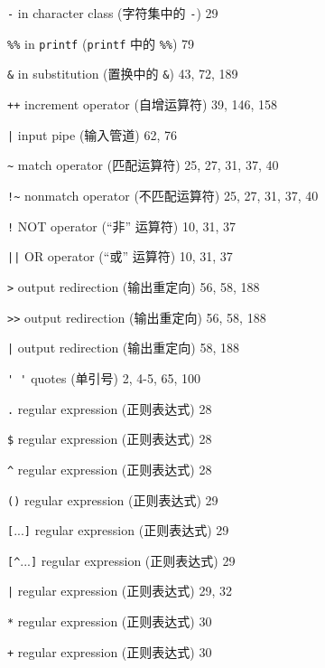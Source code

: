 \begin{multicols}{2}
\hangindent=2pc  \verb'-' in character class (字符集中的
\verb'-') 29

\hangindent=2pc  \verb'%%' in \verb'printf' (\verb'printf' 中的
\verb'%%') 79

\hangindent=2pc  \verb'&' in substitution (置换中的
\verb'&') 43, 72, 189

\hangindent=2pc  \verb'++' increment operator (自增运算符) 39, 146, 158

\hangindent=2pc  \verb'|' input pipe (输入管道) 62, 76

\hangindent=2pc  \verb'~' match operator (匹配运算符) 25, 27, 31, 37, 40

\hangindent=2pc  \verb'!~' nonmatch operator (不匹配运算符) 25, 27, 31, 37, 40

\hangindent=2pc  \verb'!' NOT operator (``非'' 运算符) 10, 31, 37

\hangindent=2pc  \verb'||' OR operator (``或'' 运算符) 10, 31, 37

\hangindent=2pc  \verb'>' output redirection (输出重定向) 56, 58, 188

\hangindent=2pc  \verb'>>' output redirection (输出重定向) 56, 58, 188

\hangindent=2pc  \verb'|' output redirection (输出重定向) 58, 188

\hangindent=2pc  \verb"' '" quotes (单引号) 2, 4-5, 65, 100

\hangindent=2pc  \verb'.' regular expression (正则表达式) 28

\hangindent=2pc  \verb'$' regular expression (正则表达式) 28

\hangindent=2pc  \verb'^' regular expression (正则表达式) 28

\hangindent=2pc  \verb'()' regular expression (正则表达式) 29

\hangindent=2pc  \verb'['...\verb']' regular expression
(正则表达式) 29

\hangindent=2pc  \verb'[^'...\verb']' regular expression
(正则表达式) 29

\hangindent=2pc  \verb'|' regular expression (正则表达式) 29, 32

\hangindent=2pc  \verb'*' regular expression (正则表达式) 30

\hangindent=2pc  \verb'+' regular expression (正则表达式) 30


\end{multicols}
